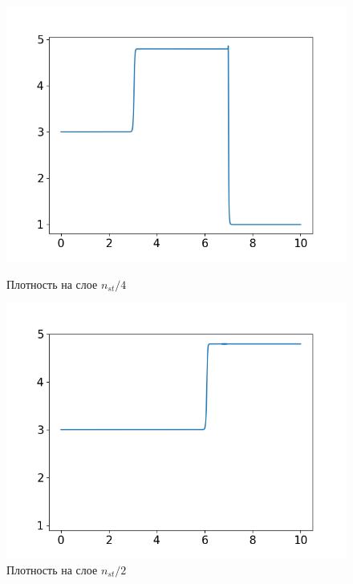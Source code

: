 \begin{figure}[h]
	\begin{minipage}[h]{0.47\linewidth}
		\centering
		\includegraphics[width=1\linewidth]{pics/task4/14h_1.png} 
		\caption{Плотность на слое $n_{st} / 4$}
	\end{minipage}
	\hfill
	\begin{minipage}[h]{0.47\linewidth}
		\centering
		\includegraphics[width=1\linewidth]{pics/task4/24h_1.png} 
		\caption{Плотность на слое $n_{st} / 2$}
	\end{minipage}
	\vfill
	\begin{minipage}[h]{0.47\linewidth}
		\centering

\end{minipage}
\end{figure}
